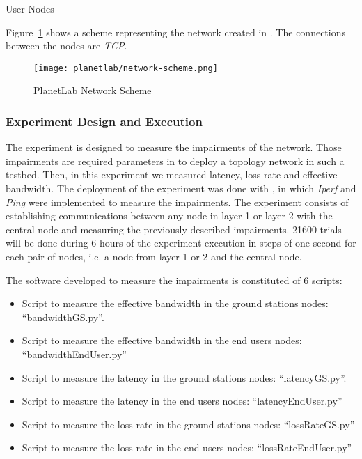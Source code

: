 \begin{table}[hp]
  \centering
  {\small
  
  }
  \caption{User Nodes}
  \label{tab:ple-tablelayer2-nodes}
\end{table}


Figure~\ref{fig:ple-network-scheme} shows a scheme representing the network created in \pl. The
connections between the nodes are \emph{TCP}.

\begin{figure}[!h]
\begin{center}
\texttt{[image: planetlab/network-scheme.png]}

\caption{PlanetLab Network Scheme}
\label{fig:ple-network-scheme}
\end{center}
\end{figure}

\subsubsection{Experiment Design and Execution}

The experiment is designed to measure the impairments of the network. Those impairments are required parameters in \vw to deploy a topology network in such a testbed. Then, in this experiment we measured latency, loss-rate and effective bandwidth. The deployment of the experiment was done with \nepi, in which \emph{Iperf} and \emph{Ping} were implemented to measure the impairments. The experiment consists of establishing communications between any node in layer 1 or layer 2 with the central node and measuring the previously described impairments. 21600 trials will be done during 6 hours of the experiment execution in steps of one second for each pair of nodes, i.e. a node from layer 1 or 2 and the central node.

The software developed to measure the impairments is constituted of 6 scripts:
\begin{itemize}
\item Script to measure the effective bandwidth in the ground stations nodes: “bandwidthGS.py”. 
\item Script to measure the effective bandwidth in the end users nodes: “bandwidthEndUser.py”
\item Script to measure the latency in the ground stations nodes: “latencyGS.py”.
\item Script to measure the latency  in the end users nodes: “latencyEndUser.py”
\item Script to measure the loss rate in the ground stations nodes: “lossRateGS.py”
\item Script to measure the loss rate in the end users nodes:
  “lossRateEndUser.py”

\end{itemize}

